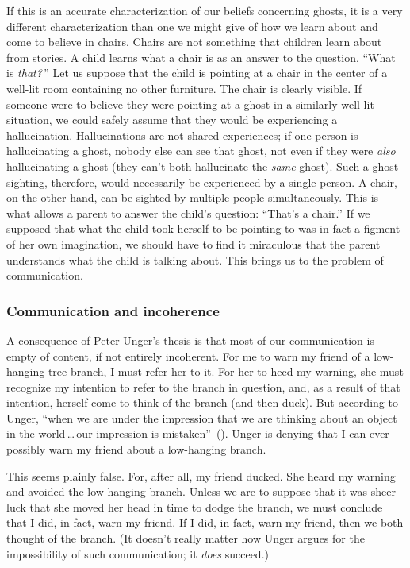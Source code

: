 \documentclass[11pt]{article}
\begin{document}
\begin{spacing}{1.5}
If this is an accurate characterization of our beliefs concerning ghosts, it is a very different characterization than one we might give of how we learn about and come to believe in chairs. Chairs are not something that children learn about from stories. A child learns what a chair is as an answer to the question, ``What is {\em that?}\,'' Let us suppose that the child is pointing at a chair in the center of a well-lit room containing no other furniture. The chair is clearly visible. If someone were to believe they were pointing at a ghost in a similarly well-lit situation, we could safely assume that they would be experiencing a hallucination. Hallucinations are not shared experiences; if one person is hallucinating a ghost, nobody else can see that ghost, not even if they were {\em also} hallucinating a ghost (they can't both hallucinate the {\em same} ghost). Such a ghost sighting, therefore, would necessarily be experienced by a single person. A chair, on the other hand, can be sighted by multiple people simultaneously. This is what allows a parent to answer the child's question: ``That's a chair.'' If we supposed that what the child took herself to be pointing to was in fact a figment of her own imagination, we should have to find it miraculous that the parent understands what the child is talking about. This brings us to the problem of communication.
%

\subsubsection{Communication and incoherence}
\label{unger-comm}
A consequence of Peter Unger's thesis is that most of our communication is empty of content, if not entirely incoherent. For me to warn my friend of a low-hanging tree branch, I must refer her to it. For her to heed my warning, she must recognize my intention to refer to the branch in question, and, as a result of that intention, herself come to think of the branch (and then duck). But according to Unger, ``when we are under the impression that we are thinking about an object in the world\,\ldots\,our impression is mistaken''~(\citeyear[149]{unger1979}). Unger is denying that I can ever possibly warn my friend about a low-hanging branch.

This seems plainly false. For, after all, my friend ducked. She heard my warning and avoided the low-hanging branch. Unless we are to suppose that it was sheer luck that she moved her head in time to dodge the branch, we must conclude that I did, in fact, warn my friend. If I did, in fact, warn my friend, then we both thought of the branch. (It doesn't really matter how Unger argues for the impossibility of such communication; it {\em does} succeed.)%


\end{spacing}
\end{document}
